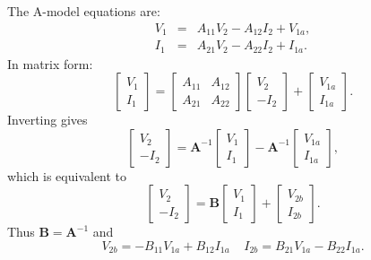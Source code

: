 \documentclass[a4paper, 12pt]{article}
\newcommand{\mat}[1]{\mathbf{#1}}
\newcommand{\bigspace}{\;\;\;\;}
\begin{document}
The A-model equations are:
%
\begin{eqnarray}
  V_1 & = & A_{11} V_2 - A_{12} I_2 + V_{1a}, \\
  I_1 & = & A_{21} V_2 - A_{22} I_2 + I_{1a}.
\end{eqnarray}
%
In matrix form:
%
\begin{equation}
  \begin{bmatrix}
    V_1 \\ I_1
  \end{bmatrix}
  =
  \begin{bmatrix}
    A_{11} & A_{12} \\
    A_{21} & A_{22}
  \end{bmatrix}
  \begin{bmatrix}
    V_2 \\ -I_2
  \end{bmatrix}
  +
  \begin{bmatrix}
    V_{1a} \\ I_{1a}
  \end{bmatrix}.
\end{equation}
%
Inverting gives
%
\begin{equation}
  \begin{bmatrix}
    V_2 \\ -I_2
  \end{bmatrix}
  =
  \mat{A}^{-1}
  \begin{bmatrix}
    V_1 \\ I_1
  \end{bmatrix}
  -
  \mat{A}^{-1}
  \begin{bmatrix}
    V_{1a} \\ I_{1a}
  \end{bmatrix},
\end{equation}
%
which is equivalent to
%
\begin{equation}
  \begin{bmatrix}
    V_2 \\ -I_2
  \end{bmatrix}
  =
  \mat{B}
  \begin{bmatrix}
    V_1 \\ I_1
  \end{bmatrix}
  +
  \begin{bmatrix}
    V_{2b} \\ I_{2b}
  \end{bmatrix}.
\end{equation}
%
Thus $\mat{B} = \mat{A}^{-1}$ and
%
\begin{equation}
V_{2b} = -B_{11} V_{1a} + B_{12} I_{1a} \bigspace I_{2b} = B_{21} V_{1a} - B_{22} I_{1a}.
\end{equation}
\end{document}
